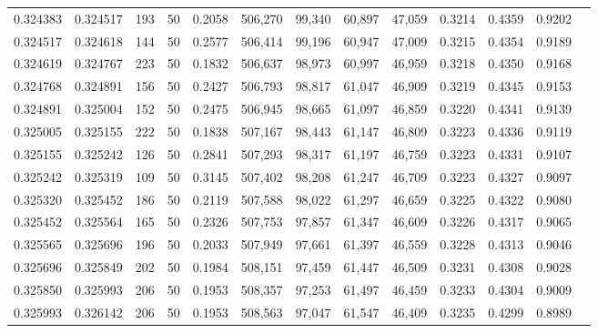 \begin{tabular}{rrrrrrrrrrrrr}
0.324383 & 0.324517 &   193 &  50 &                                     0.2058 & 506,270 &  99,340 &  60,897 &  47,059 & 0.3214 & 0.4359 & 0.9202 \\
0.324517 & 0.324618 &   144 &  50 &                                     0.2577 & 506,414 &  99,196 &  60,947 &  47,009 & 0.3215 & 0.4354 & 0.9189 \\
0.324619 & 0.324767 &   223 &  50 &                                     0.1832 & 506,637 &  98,973 &  60,997 &  46,959 & 0.3218 & 0.4350 & 0.9168 \\
0.324768 & 0.324891 &   156 &  50 &                                     0.2427 & 506,793 &  98,817 &  61,047 &  46,909 & 0.3219 & 0.4345 & 0.9153 \\
0.324891 & 0.325004 &   152 &  50 &                                     0.2475 & 506,945 &  98,665 &  61,097 &  46,859 & 0.3220 & 0.4341 & 0.9139 \\
0.325005 & 0.325155 &   222 &  50 &                                     0.1838 & 507,167 &  98,443 &  61,147 &  46,809 & 0.3223 & 0.4336 & 0.9119 \\
0.325155 & 0.325242 &   126 &  50 &                                     0.2841 & 507,293 &  98,317 &  61,197 &  46,759 & 0.3223 & 0.4331 & 0.9107 \\
0.325242 & 0.325319 &   109 &  50 &                                     0.3145 & 507,402 &  98,208 &  61,247 &  46,709 & 0.3223 & 0.4327 & 0.9097 \\
0.325320 & 0.325452 &   186 &  50 &                                     0.2119 & 507,588 &  98,022 &  61,297 &  46,659 & 0.3225 & 0.4322 & 0.9080 \\
0.325452 & 0.325564 &   165 &  50 &                                     0.2326 & 507,753 &  97,857 &  61,347 &  46,609 & 0.3226 & 0.4317 & 0.9065 \\
0.325565 & 0.325696 &   196 &  50 &                                     0.2033 & 507,949 &  97,661 &  61,397 &  46,559 & 0.3228 & 0.4313 & 0.9046 \\
0.325696 & 0.325849 &   202 &  50 &                                     0.1984 & 508,151 &  97,459 &  61,447 &  46,509 & 0.3231 & 0.4308 & 0.9028 \\
0.325850 & 0.325993 &   206 &  50 &                                     0.1953 & 508,357 &  97,253 &  61,497 &  46,459 & 0.3233 & 0.4304 & 0.9009 \\
0.325993 & 0.326142 &   206 &  50 &                                     0.1953 & 508,563 &  97,047 &  61,547 &  46,409 & 0.3235 & 0.4299 & 0.8989 \\

\end{tabular}
